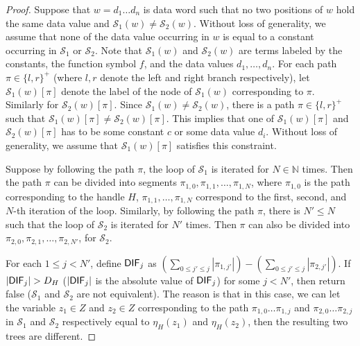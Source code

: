 \documentclass[runningheads,a4paper]{llncs}
\newcommand\nat{\mathbb{N}}
\newcommand\Ss{\mathcal{S}}
\begin{document}
\begin{proof}
Suppose that $w = d_1 \dots d_n$ is data word such that no two positions of $w$ hold the same data value and $\Ss_1(w) \neq \Ss_2(w)$. Without loss of generality, we assume that none of the data value occurring in $w$ is equal to a constant occurring in $\Ss_1$ or $\Ss_2$.  Note that $\Ss_1(w)$ and $\Ss_2(w)$ are terms labeled by the constants, the function symbol $f$, and the data values $d_1,\dots,d_n$. For each path $\pi \in \{l, r\}^+$ (where $l,r$ denote the left and right branch respectively), let $\Ss_1(w)[\pi]$ denote the label of the node of $\Ss_1(w)$ corresponding to $\pi$. Similarly for $\Ss_2(w)[\pi]$. Since $\Ss_1(w) \neq \Ss_2(w)$, there is a path $\pi \in \{l, r\}^+$ such that  $\Ss_1(w)[\pi] \neq \Ss_2(w)[\pi]$. This implies that one of $\Ss_1(w)[\pi]$ and $\Ss_2(w)[\pi]$ has to be some constant $c$ or some data value $d_i$. Without loss of generality, we assume that $\Ss_1(w)[\pi]$ satisfies this constraint.

Suppose by following the path $\pi$, the loop of $\Ss_1$ is iterated for $N \in \nat$ times.  Then the path $\pi$ can be divided into segments $\pi_{1,0}, \pi_{1,1}, \dots, \pi_{1,N}$, where $\pi_{1,0}$ is the path corresponding to the handle $H$, $\pi_{1,1},\dots, \pi_{1,N}$ correspond to the first, second, and $N$-th iteration of the loop. Similarly, by following the path $\pi$, there is $N' \le N$ such that the loop of $\Ss_2$ is iterated for $N'$ times. Then $\pi$ can also be divided into $\pi_{2,0}, \pi_{2,1},\dots, \pi_{2,N'}$, for $\Ss_2$.

For each $1 \le j < N'$, define ${\sf DIF}_{j}$ as $ (\sum \limits_{0 \le j' \le j} |\pi_{1,j'}|) - (\sum \limits_{0 \le j' \le j} |\pi_{2,j'}|) $. If $|{\sf DIF}_j| > D_H$ ($|{\sf DIF}_j|$ is the absolute value of ${\sf DIF}_j$) for some $j < N'$, then return false ($\Ss_1$ and $\Ss_2$ are not equivalent). The reason is that in this case, we can let the variable $z_1 \in Z$  and $z_2 \in Z$ corresponding to the path $\pi_{1,0} \dots \pi_{1,j}$ and  $\pi_{2,0} \dots \pi_{2,j}$ in $\Ss_1$ and $\Ss_2$ respectively equal to $\eta_H(z_1)$ and $\eta_H(z_2)$, then the resulting two trees are different.


\end{proof}
\end{document}
